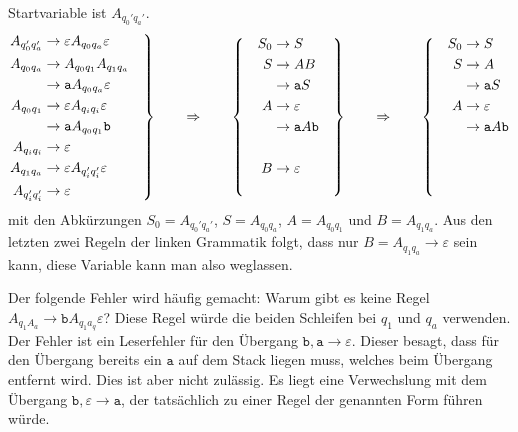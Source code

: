 \begin{loesung}
Startvariable ist $A_{q_0'q_a'}$.
\[
\left.
\begin{aligned}
A_{q_0'q_a'} & \to \varepsilon A_{q_0q_a}\varepsilon  \\
A_{q_0q_a}   & \to A_{q_0q_1}A_{q_1q_a} \\
             & \to \texttt{a} A_{q_0q_a}\varepsilon \\
A_{q_0q_1}   & \to \varepsilon A_{q_iq_i}\varepsilon  \\
             & \to \texttt{a} A_{q_0q_1} \texttt{b} \\
A_{q_iq_i}   & \to \varepsilon \\
A_{q_1q_a}   & \to \varepsilon A_{q_i'q_i'}\varepsilon  \\
A_{q_i'q_i'} & \to \varepsilon \\
\end{aligned}
\quad
\right\}
\qquad\Rightarrow\qquad
\left\{
\quad
\begin{aligned}
S_0 & \to S \\
S   & \to AB \\
    & \to \texttt{a} S  \\
A   & \to \varepsilon \\
    & \to \texttt{a} A \texttt{b} \\
    &\mathstrut \\
B   & \to \varepsilon \\
    &\mathstrut \\
\end{aligned}
\quad
\right\}
\qquad\Rightarrow\qquad
\left\{
\quad
\begin{aligned}
S_0 & \to S \\
S   & \to A \\
    & \to \texttt{a} S  \\
A   & \to \varepsilon \\
    & \to \texttt{a} A \texttt{b} \\
    &\mathstrut \\
    &\mathstrut \\
    &\mathstrut \\
\end{aligned}
\right.
\]
mit den Abkürzungen $S_0=A_{q_0'q_a'}$, $S=A_{q_0q_a}$, $A=A_{q_0q_1}$
und $B=A_{q_1q_a}$.
Aus den letzten zwei Regeln der linken Grammatik folgt, dass
nur $B=A_{q_1q_a}\to \varepsilon$ sein kann, diese Variable kann man also
weglassen.

Der folgende Fehler wird häufig gemacht: Warum gibt es keine Regel
$A_{q_1A_a} \to \texttt{b}A_{q_1a_q}\varepsilon$?
Diese Regel würde die beiden Schleifen bei $q_1$ und $q_a$ verwenden.
Der Fehler ist ein Leserfehler für den Übergang
$\texttt{b},\texttt{a}\to\varepsilon$.
Dieser besagt, dass für den Übergang bereits ein $\texttt{a}$ auf dem Stack
liegen muss, welches beim Übergang entfernt wird.
Dies ist aber nicht zulässig.
Es liegt eine Verwechslung mit dem Übergang 
$\texttt{b},\varepsilon\to\texttt{a}$,
der tatsächlich zu einer Regel der genannten Form führen würde.
\end{loesung}



